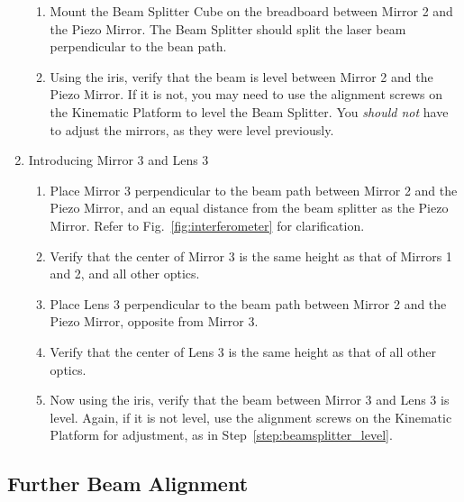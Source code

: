 \begin{enumerate}
\begin{enumerate}
        \item Mount the Beam Splitter Cube on the breadboard between
			  Mirror 2 and the Piezo Mirror. The Beam Splitter should split the laser beam perpendicular to the bean path.
        \item Using the iris, verify that the beam is level between Mirror 2 and
        the Piezo Mirror. If it is not, you may need to use the alignment screws
        on the Kinematic Platform to level the Beam Splitter. You \emph{should
        not} have to adjust the mirrors, as they were level previously.
        \label{step:beamsplitter_level}
        \end{enumerate}
    \item Introducing Mirror 3 and Lens 3
        \begin{enumerate}
        \item Place Mirror 3 perpendicular to the beam path between Mirror 2 and
        the Piezo Mirror, and an equal distance from the beam splitter as the
        Piezo Mirror. Refer to Fig.~\ref{fig:interferometer} for clarification.
        \item Verify that the center of Mirror 3 is the same height as that of
        Mirrors 1 and 2, and all other optics.
        \item Place Lens 3 perpendicular to the beam path between Mirror 2 and
        the Piezo Mirror, opposite from Mirror 3. 
        \item Verify that the center of Lens 3 is the same height as that of all
        other optics.
        \item Now using the iris, verify that the beam between Mirror 3 and Lens
        3 is level. Again, if it is not level, use the alignment screws on the
        Kinematic Platform for adjustment, as in
        Step~\ref{step:beamsplitter_level}.  
        \end{enumerate}
    \end{enumerate}
        
\subsection{Further Beam Alignment}
\label{sub:further}

